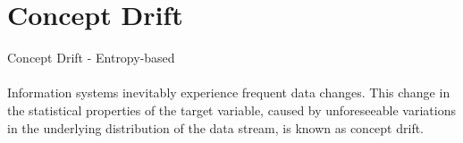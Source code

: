 \documentclass[10pt,oneside,english,a4paper]{article}
\begin{document}
\clearpage
\section{Concept Drift}
Concept Drift - Entropy-based\\\\
Information systems inevitably experience frequent data changes. 
This change in the statistical properties of the target variable, caused by
unforeseeable variations in the underlying distribution of the data
stream, is known as concept drift.\cite{Sun2024}


\clearpage
\thispagestyle{empty}
\mbox{}
\clearpage








\clearpage 
\normalsize 
 
 
\nocite{*}
\end{document}
